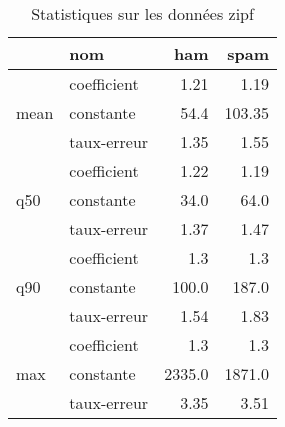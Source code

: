 \begin{table}[H]
\centering
\caption{Statistiques sur les données zipf}
\label{tab:f_zipf}
\begin{tabular}{ll|rr}
\toprule
 & nom & ham & spam \\
\midrule
\multirow[c]{3}{*}{mean} & coefficient & 1.21 & 1.19 \\
 & constante & 54.4 & 103.35 \\
 & taux-erreur & 1.35 & 1.55 \\
\cline{1-4}
\multirow[c]{3}{*}{q50} & coefficient & 1.22 & 1.19 \\
 & constante & 34.0 & 64.0 \\
 & taux-erreur & 1.37 & 1.47 \\
\cline{1-4}
\multirow[c]{3}{*}{q90} & coefficient & 1.3 & 1.3 \\
 & constante & 100.0 & 187.0 \\
 & taux-erreur & 1.54 & 1.83 \\
\cline{1-4}
\multirow[c]{3}{*}{max} & coefficient & 1.3 & 1.3 \\
 & constante & 2335.0 & 1871.0 \\
 & taux-erreur & 3.35 & 3.51 \\
\cline{1-4}
\bottomrule
\end{tabular}
\end{table}
